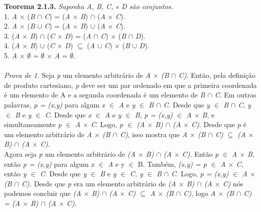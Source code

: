 \textbf{Teorema 2.1.3.} \textit{Suponha A, B, C, e D são conjuntos.}
\\
1. \textit{A} $\times$ (\textit{B} $\cap$ \textit{C}) = (\textit{A} $\times$ \textit{B}) $\cap$ (\textit{A} $\times$ \textit{C}).
\\
2. \textit{A} $\times$ (\textit{B} $\cup$ \textit{C}) = (\textit{A} $\times$ \textit{B}) $\cup$ (\textit{A} $\times$ \textit{C}).
\\
3. (\textit{A} $\times$ \textit{B}) $\cap$ (\textit{C} $\times$ \textit{D}) = (\textit{A} $\cap$ \textit{C}) $\times$ (\textit{B}
$\cap$ \textit{D}).
\\
4. (\textit{A} $\times$ \textit{B}) $\cup$ (\textit{C} $\times$ \textit{D}) $\subseteq$ (\textit{A} $\cup$ \textit{C}) $\times$ (\textit{B}
$\cup$ \textit{D}).
\\
5. \textit{A} $\times$ $\emptyset$ = $\emptyset$ $\times$ \textit{A} = $\emptyset$.  
\\
\\
\textit{Prova de 1. } Seja \textit{p} um elemento arbitrário de \textit{ A $\times$ (B $\cap$ C)}. Então, pela definição de produto
cartesiano, \textit{p} deve ser um par ordenado em que a primeira coordenada é um elemento de A e a segunda coordenada é um elemento
de \textit{B $\cap$ C}. Em outras palavras, \textit{p = (x,y)} para algum \textit{x $\in$ A} e \textit{y $\in$ B $\cap$ C}.
Desde que \textit{y $\in$ B $\cap$ C}, \textit{y $\in$ B} e \textit{y $\in$ C}. Desde que \textit{x $\in$ A} e \textit{y $\in$ B},
\textit{p = (x,y) $\in$ A $\times$ B}, e simultaneamente \textit{p $\in$ A $\times$ C}. Logo, \textit{p $\in$ (A $\times$ B) 
$\cap$ (A $\times$ C)}. Desde que \textit{p} é um elemento arbitrário de \textit{ A $\times$ (B $\cap$ C)}, isso mostra que 
\textit{ A $\times$ (B $\cap$ C) $\subseteq$ (A $\times$ B) $\cap$ (A $\times$ C)}.
\\
  Agora seja \textit{p} um elemento arbitrário de \textit{(A $\times$ B) $\cap$ (A $\times$ C)}. Então \textit{p} $\in$
  \textit{A $\times$ B}, então \textit{p = (x,y)} para algum \textit{x $\in$ A} e {y $\in$ B}. Também, \textit{(x,y) = p $\in$
  A $\times$ C}, então \textit{y $\in$ C}. Desde que \textit{y $\in$ B} e \textit{y $\in$ C, y $\in$ B $\cap$ C.} Logo, 
  \textit{p = (x,y) $\in$ A $\times$ (B $\cap$ C).} Desde que \textit{p} era um elemento arbitrário de \textit{(A $\times$ B)
  $\cap$ (A $\times$ C)} nós podemos concluir que \textit{(A $\times$ B) $\cap$ (A $\times$ C) $\subseteq$ A $\times$ (B $\cap$
  C)}, logo \textit{A $\times$ (B $\cap$ C) = (A $\times$ B) $\cap$ (A $\times$ C).}

